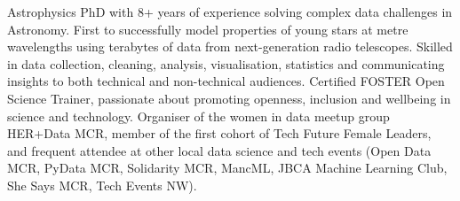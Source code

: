  \vspace{-6pt}

\begin{cvpubs}
  \cvpub
    {
      \begin{cvlist}
  \item {Astrophysics PhD with 8+ years of experience solving complex data challenges in Astronomy. First to successfully model properties of young stars at metre wavelengths using terabytes of data from next-generation radio telescopes. Skilled in data collection, cleaning, analysis, visualisation, statistics and communicating insights to both technical and non-technical audiences. Certified FOSTER Open Science Trainer, passionate about promoting openness, inclusion and wellbeing in science and technology. Organiser of the women in data meetup group HER+Data MCR, member of the first cohort of Tech Future Female Leaders, and frequent attendee at other local data science and tech events (Open Data MCR, PyData MCR, Solidarity MCR, MancML, JBCA Machine Learning Club, She Says MCR, Tech Events NW).}
      \end{cvlist}
    }
\vspace{-11pt}
\end{cvpubs}

